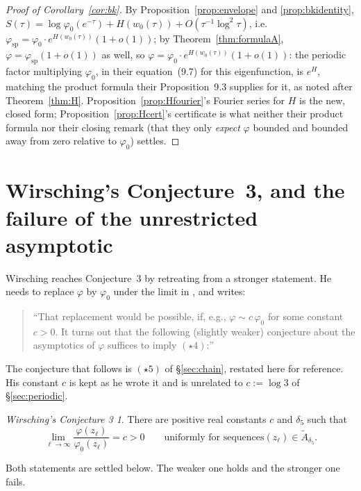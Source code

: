 \documentclass[11pt]{article}
\theoremstyle{definition}
\theoremstyle{remark}
\newtheorem*{conjecture}{Wirsching's Conjecture 3}
\begin{document}
\begin{proof}[Proof of Corollary~\ref{cor:bk}]
By Proposition~\ref{prop:envelope} and \ref{prop:bkidentity}, $S(\tau) = \log\varphi_0(e^{-\tau}) +
H(w_0(\tau)) + O(\tau^{-1}\log^2\tau)$, i.e.\ $\varphi_{\mathrm{sp}} = \varphi_0\cdot
e^{H(w_0(\tau))}(1+o(1))$; by Theorem~\ref{thm:formulaA}, $\varphi=\varphi_{\mathrm{sp}}(1+o(1))$
as well, so $\varphi = \varphi_0\cdot e^{H(w_0(\tau))}(1+o(1))$: the periodic factor multiplying
$\varphi_0$, in their equation~(9.7) for this eigenfunction, is $e^H$,
matching the product formula their Proposition~9.3 supplies for it, as noted after
Theorem~\ref{thm:H}. Proposition~\ref{prop:Hfourier}'s Fourier series for $H$ is the new, closed
form; Proposition~\ref{prop:Hcert}'s certificate is what neither their product formula nor their
closing remark (that they only \emph{expect} $\varphi$ bounded and bounded away from zero relative
to $\varphi_0$) settles.
\end{proof}

\section{Wirsching's Conjecture~3, and the failure of the unrestricted
asymptotic}
\label{sec:proofs}

Wirsching reaches Conjecture~3 by retreating from a stronger statement.
He needs to replace $\varphi$ by $\varphi_0$ under the limit in
\cite[eq.~(7.5)]{Wirsching2003}, and writes:

\begin{quote}
``That replacement would be possible, if, e.g., $\varphi \sim c\,\varphi_0$ for some constant
$c > 0$. It turns out that the following (slightly weaker) conjecture about the asymptotics
of $\varphi$ suffices to imply $(\star4)$:''
\end{quote}

\noindent The conjecture that follows is $(\star5)$ of
\S\ref{sec:chain}, restated here for reference. His constant $c$ is kept as he wrote it and is unrelated
to $c:=\log3$ of \S\ref{sec:periodic}.

\begin{conjecture}
There are positive real constants $c$ and $\delta_5$ such that
\[
\lim_{\ell\to\infty} \frac{\varphi(z_\ell)}{\varphi_0(z_\ell)} = c > 0 \qquad \text{uniformly for sequences
} (z_\ell) \in \widetilde A_{\delta_5}.
\]
\end{conjecture}

Both statements are settled below. The weaker one holds and the
stronger one fails.
\end{document}
